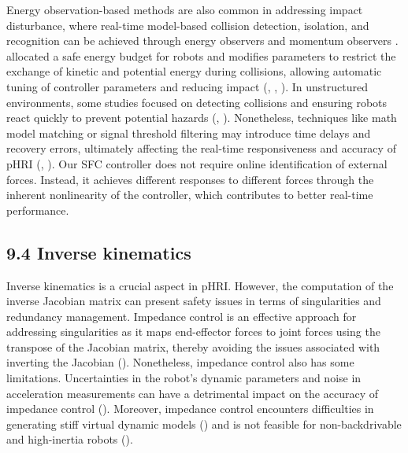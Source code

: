 Energy observation-based methods are also common in addressing impact disturbance, where real-time model-based collision detection, isolation, and recognition can be achieved through energy observers and momentum observers \cite{haddadin2017robot}. \cite{lachner2021energy} allocated a safe energy budget for robots and modifies parameters to restrict the exchange of kinetic and potential energy during collisions, allowing automatic tuning of controller parameters and reducing impact (\cite{raiola2018development}, \cite{munoz2019time}, \cite{navarro2016iso10218}). In unstructured environments, some studies focused on detecting collisions and ensuring robots react quickly to prevent potential hazards (\cite{de2012integrated}, \cite{khan2014compliance}). Nonetheless, techniques like math model matching or signal threshold filtering may introduce time delays and recovery errors, ultimately affecting the real-time responsiveness and accuracy of pHRI (\cite{haddadin2017robot}, \cite{lin2021adaptive}). Our SFC controller does not require online identification of external forces. Instead, it achieves different responses to different forces through the inherent nonlinearity of the controller, which contributes to better real-time performance.

\subsection{9.4 Inverse kinematics}
Inverse kinematics is a crucial aspect in pHRI. However, the computation of the inverse Jacobian matrix can present safety issues in terms of singularities and redundancy management. Impedance control is an effective approach for addressing singularities as it maps end-effector forces to joint forces using the transpose of the Jacobian matrix, thereby avoiding the issues associated with inverting the Jacobian (\cite{albu2002cartesian}). Nonetheless, impedance control also has some limitations. Uncertainties in the robot's dynamic parameters and noise in acceleration measurements can have a detrimental impact on the accuracy of impedance control (\cite{lynch2017modern}). Moreover, impedance control encounters difficulties in generating stiff virtual dynamic models (\cite{keemink2018admittance}) and is not feasible for non-backdrivable and high-inertia robots (\cite{villani2016force}). 


